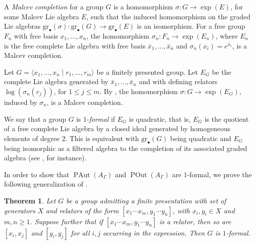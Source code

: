 \documentclass[10pt]{amsart}
\newtheorem{theorem}{Theorem}[section]
\theoremstyle{definition}
\newcommand{\PAut}{\operatorname{PAut}}
\newcommand{\POut}{\operatorname {POut}}
\newcommand{\gr}{\mathrm{gr}_\bullet}
\theoremstyle{definition}
\numberwithin{equation}{section}
\begin{document}
A \textit{Malcev completion} for a group $G$ is a homomorphism $\sigma \colon G \to \exp(E)$, for some Malcev Lie algebra $E$, such that
the induced homomorphism on the graded Lie algebras $\gr(\sigma) \colon \gr(G) \to \gr(E)$ is an isomorphism. For a free group $F_n$ with free basis $x_1, \ldots, x_n$,
the homomorphism $\sigma_n \colon F_n \to \exp(E_n)$, where $E_n$ is the free complete Lie algebra with free basis $\bar{x}_1, \ldots, \bar{x}_n$ and
$\sigma_n(x_i)= e^{\bar{x}_i}$, is a Malcev completion.

Let $G = \langle x_1, \ldots, x_n \mid r_1, \ldots, r_m \rangle$ be a finitely presented group. Let $E_G$ be the complete Lie algebra generated by
$\bar{x}_1, \ldots, \bar{x}_n$ and with defining relators $\log( \sigma_n(r_j) )$, for $1 \leq j \leq m$. By \cite[Thm.~2.2]{Papadima}, the homomorphism $\sigma \colon G \to \exp(E_G)$, induced by $\sigma_n$, is a Malcev completion.



We say that a group $G$ is $1$-\textit{formal} if $E_G$ is quadratic, that is, $E_G$ is the quotient of a free complete Lie algebra by a closed
ideal generated by homogeneous elements of degree $2$. This is equivalent with $\gr(G)$ being quadratic and $E_G$ being isomorphic as a filtered
algebra to the completion of its associated graded algebra (see \cite{SuciuWang2}, for instance).

In order to show that $\PAut(A_\Gamma)$ and $\POut(A_{\Gamma})$ are $1$-formal, we prove the following generalization of \cite[Theorem~5.4]{BerceanuPapadima}.

\begin{theorem}  \label{1formalthm}
 Let $G$ be a group admitting a finite presentation with set of generators $X$ and relators of the form $[x_1 \cdots x_m, y_1 \cdots y_n]$, with
 $x_i,y_i \in X$ and $m,n \geq 1$. Suppose further that if $[x_1 \cdots x_m, y_1 \cdots y_n]$ is a relator, then so are $[x_i,x_j]$
 and $[y_i,y_j]$ for all $i,j$ occurring in the expression. Then $G$ is $1$-formal.
\end{theorem}
\end{document}
